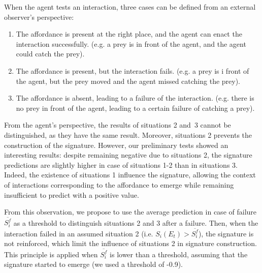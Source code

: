 \documentclass[conference]{IEEEtran}
\begin{document}
When the agent tests an interaction, three cases can be defined from an external observer's perspective:
\begin{enumerate}
\item The affordance is present at the right place, and the agent can enact the interaction successfully. (e.g. a prey is in front of the agent, and the agent could catch the prey).
\item The affordance is present, but the interaction fails. (e.g. a prey is i front of the agent, but the prey moved and the agent missed catching the prey).
\item The affordance is absent, leading to a failure of the interaction. (e.g. there is no prey in front of the agent, leading to a certain failure of catching a prey).
\end{enumerate}
From the agent's perspective, the results of situations 2 and~3 cannot be distinguished, as they have the same result. Moreover, situations 2 prevents the construction of the signature.
However, our preliminary tests showed an interesting results: despite remaining negative due to situations 2, the signature predictions are slightly higher in case of situations 1-2 than in situations 3. Indeed, the existence of situations 1 influence the signature, allowing the context of interactions corresponding to the affordance to emerge while remaining insufficient to predict with a positive value.

From this observation, we propose to use the average prediction in case of failure $\overline{S_i^f}$ as a threshold to distinguish situations 2 and 3 after a failure. Then, when the interaction failed in an assumed situation 2 (i.e. $S_i(E_t)>\overline{S_i^f}$), the signature is not reinforced, which limit the influence of situations 2 in signature construction. This principle is applied when $\overline{S_i^f}$ is lower than a threshold, assuming that the signature started to emerge (we used a threshold of -0.9).

\end{document}
